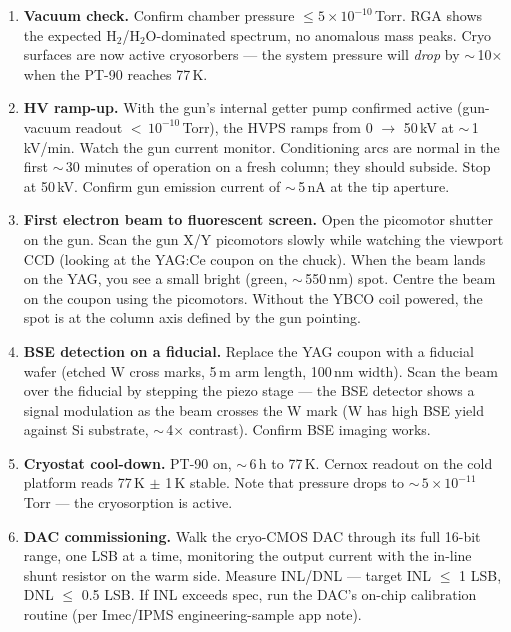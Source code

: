 \documentclass[11pt,letterpaper]{article}
\begin{document}
\begin{enumerate}[leftmargin=1.6em]
  \item \textbf{Vacuum check.} Confirm chamber pressure $\leq 5 \times 10^{-10}$\,Torr. RGA shows the expected H$_2$/H$_2$O-dominated spectrum, no anomalous mass peaks. Cryo surfaces are now active cryosorbers --- the system pressure will \textit{drop} by $\sim$\,10$\times$ when the PT-90 reaches 77\,K.

  \item \textbf{HV ramp-up.} With the gun's internal getter pump confirmed active (gun-vacuum readout $<$\,$10^{-10}$\,Torr), the HVPS ramps from 0 $\to$ 50\,kV at $\sim$\,1\,kV/min. Watch the gun current monitor. Conditioning arcs are normal in the first $\sim$\,30 minutes of operation on a fresh column; they should subside. Stop at 50\,kV. Confirm gun emission current of $\sim$\,5\,nA at the tip aperture.

  \item \textbf{First electron beam to fluorescent screen.} Open the picomotor shutter on the gun. Scan the gun X/Y picomotors slowly while watching the viewport CCD (looking at the YAG:Ce coupon on the chuck). When the beam lands on the YAG, you see a small bright (green, $\sim$\,550\,nm) spot. Centre the beam on the coupon using the picomotors. Without the YBCO coil powered, the spot is at the column axis defined by the gun pointing.

  \item \textbf{BSE detection on a fiducial.} Replace the YAG coupon with a fiducial wafer (etched W cross marks, 5\,\textmu m arm length, 100\,nm width). Scan the beam over the fiducial by stepping the piezo stage --- the BSE detector shows a signal modulation as the beam crosses the W mark (W has high BSE yield against Si substrate, $\sim$\,4$\times$ contrast). Confirm BSE imaging works.

  \item \textbf{Cryostat cool-down.} PT-90 on, $\sim$\,6\,h to 77\,K. Cernox readout on the cold platform reads 77\,K $\pm$ 1\,K stable. Note that pressure drops to $\sim$\,$5 \times 10^{-11}$\,Torr --- the cryosorption is active.

  \item \textbf{DAC commissioning.} Walk the cryo-CMOS DAC through its full 16-bit range, one LSB at a time, monitoring the output current with the in-line shunt resistor on the warm side. Measure INL/DNL --- target INL $\leq$ 1 LSB, DNL $\leq$ 0.5 LSB. If INL exceeds spec, run the DAC's on-chip calibration routine (per Imec/IPMS engineering-sample app note).


\end{enumerate}
\end{document}
